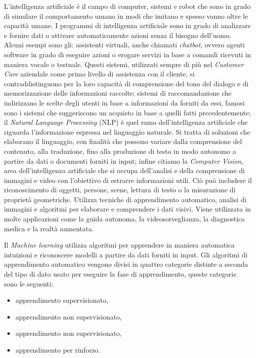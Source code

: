 \documentclass[12pt,italian]{report}
\begin{document}
	L'intelligenza artificiale è il campo di computer, sistemi e robot che sono in grado di simulare il comportamento umano in modi che imitano e spesso vanno oltre le capacità umane. I programmi di intelligenza artificiale sono in grado di analizzare e fornire dati o attivare automaticamente azioni senza il bisogno dell'uomo. 
	Alcuni esempi sono gli: assistenti virtuali, anche chiamati \textit{chatbot}, ovvero agenti software in grado di eseguire azioni o erogare servizi in base a comandi ricevuti in maniera vocale o testuale. Questi sistemi, utilizzati sempre di più nel \textit{Customer Care} aziendale come primo livello di assistenza con il cliente, si contraddistinguono per la loro capacità di comprensione del tono del dialogo e di memorizzazione delle informazioni raccolte; sistemi di raccomandazione che indirizzano le scelte degli utenti in base a informazioni da forniti da essi, famosi sono i sistemi che suggeriscono un acquisto in base a quelli fatti precedentemente; il \textit{Natural Language Processing} (NLP) è quel ramo dell’intelligenza artificiale che riguarda l’informazione espressa nel linguaggio naturale. Si tratta di soluzioni che elaborano il linguaggio, con finalità che possono variare dalla comprensione del contenuto, alla traduzione, fino alla produzione di testo in modo autonomo a partire da dati o documenti forniti in input; infine citiamo la \textit{Computer Vision}, area dell'intelligenza artificiale che si occupa dell'analisi e della comprensione di immagini e video con l'obiettivo di estrarre informazioni utili. Ciò può includere il riconoscimento di oggetti, persone, scene, lettura di testo o la misurazione di proprietà geometriche. Utilizza tecniche di apprendimento automatico, analisi di immagini e algoritmi per elaborare e comprendere i dati visivi. Viene utilizzata in molte applicazioni come la guida autonoma, la videosorveglianza, la diagnostica medica e la realtà aumentata.
	
	Il \textit{Machine learning} utilizza algoritmi per apprendere in maniera automatica intuizioni e riconoscere modelli a partire da dati forniti in input. Gli algoritmi di apprendimento automatico vengono divisi in quattro categorie distinte a seconda del tipo di dato usato per eseguire la fase di apprendimento, queste categorie sono le seguenti:
	\begin{itemize}
		\item apprendimento supervisionato,
		\item apprendimento non supervisionato,
		\item apprendimento non supervisionato,
		\item apprendimento per rinforzo.
	\end{itemize}
	
\end{document}
